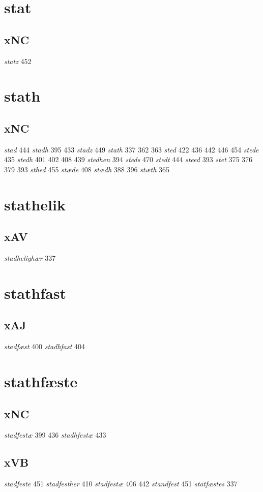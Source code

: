 \documentclass[a4paper,twocolumn]{article}
\begin{document}
\section{stat}
\label{sec:org8983a48}
\subsection{xNC}
\label{sec:org7f125e4}
\emph{statz} 452 
\section{stath}
\label{sec:org3cc9222}
\subsection{xNC}
\label{sec:org0e1dc2c}
\emph{stad} 444 \emph{stadh} 395 433 \emph{stadz} 449 \emph{stath} 337 362 363 \emph{sted} 422 436 442 446 454 \emph{stede} 435 \emph{stedh} 401 402 408 439 \emph{stedhen} 394 \emph{steds} 470 \emph{stedt} 444 \emph{steed} 393 \emph{stet} 375 376 379 393 \emph{sthed} 455 \emph{stæde} 408 \emph{stædh} 388 396 \emph{stæth} 365 
\section{stathelik}
\label{sec:org12b3df8}
\subsection{xAV}
\label{sec:org3596e5d}
\emph{stadhelighær} 337 
\section{stathfast}
\label{sec:orge3f2144}
\subsection{xAJ}
\label{sec:org027fe76}
\emph{stadfæst} 400 \emph{stadhfast} 404 
\section{stathfæste}
\label{sec:org58995e6}
\subsection{xNC}
\label{sec:org174c802}
\emph{stadfestæ} 399 436 \emph{stadhfestæ} 433 
\subsection{xVB}
\label{sec:org3bd6ed2}
\emph{stadfeste} 451 \emph{stadfesther} 410 \emph{stadfestæ} 406 442 \emph{standfest} 451 \emph{statfæstes} 337 
\end{document}
